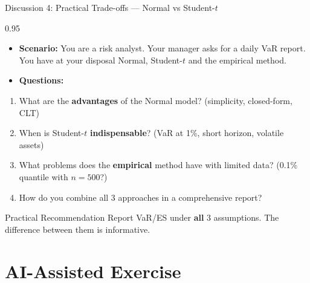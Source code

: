 \documentclass[9pt, aspectratio=169, t]{beamer}
\begin{document}
\begin{frame}{Discussion 4: Practical Trade-offs --- Normal vs Student-$t$}
\begin{cminipage}{0.95\textwidth}
    \begin{itemize}\setlength{\itemsep}{0pt}
        \item \textbf{Scenario:} You are a risk analyst. Your manager asks for a daily VaR report. You have at your disposal Normal, Student-$t$ and the empirical method.
        \item \textbf{Questions:}
    \end{itemize}
    \begin{enumerate}\setlength{\itemsep}{0pt}
        \item What are the \textbf{advantages} of the Normal model? (simplicity, closed-form, CLT)
        \item When is Student-$t$ \textbf{indispensable}? (VaR at 1\%, short horizon, volatile assets)
        \item What problems does the \textbf{empirical} method have with limited data? (0.1\% quantile with $n = 500$?)
        \item How do you combine all 3 approaches in a comprehensive report?
    \end{enumerate}

    \vspace{0.2cm}
    \begin{block}{Practical Recommendation}
        {\small Report VaR/ES under \textbf{all} 3 assumptions. The difference between them is informative.}
    \end{block}
\end{cminipage}
\end{frame}

\section{AI-Assisted Exercise}
\end{document}
